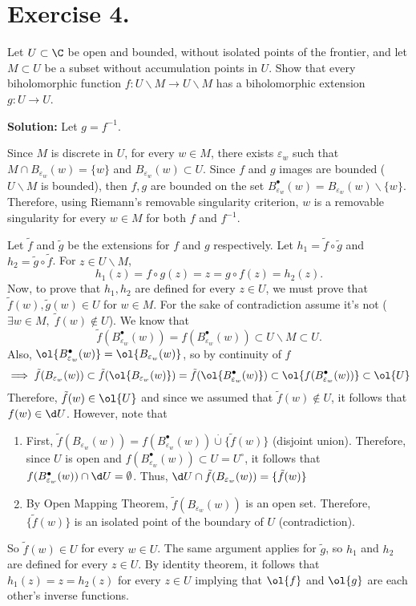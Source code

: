 \section*{Exercise 4.}

Let $U \subset \C$ be open and bounded, without isolated points of the frontier, and let $M \subset U$ be a subset without accumulation points in $U$. Show that every biholomorphic function $f: U \backslash M \to U \backslash M$ has a biholomorphic extension $g: U \to U$.

\textbf{Solution:}
Let $g = f^{-1}$.

Since $M$ is discrete in $U$, for every $w \in M$, there exists $\varepsilon_w$ such that $M \cap B_{\varepsilon_w}(w) = \{w\}$ and $B_{\varepsilon_w}(w) \subset U$. Since $f$ and $g$ images are bounded ($U\backslash M$ is bounded), then $f,g$ are bounded on the set $B_{\varepsilon_w}^\bullet(w) = B_{\varepsilon_w}(w) \backslash \{w\}$. Therefore, using Riemann's removable singularity criterion, $w$ is a removable singularity for every $w \in M$ for both $f$ and $f^{-1}$.

Let $\tilde{f}$ and $\tilde{g}$ be the extensions for $f$ and $g$ respectively. Let $h_1 = \tilde{f} \circ \tilde{g}$ and $h_2 = \tilde{g}\circ \tilde{f}$. For $z \in U\backslash M$, 
\[ h_1(z) = f\circ g (z) = z = g\circ f(z) = h_2(z). \]
Now, to prove that $h_1, h_2$ are defined for every $z\in U$, we must prove that $\tilde{f}(w), \tilde{g}(w) \in U$ for $w \in M$. For the sake of contradiction assume it's not ($\exists w \in M,\;\tilde{f}(w) \not\in U$). We know that
\[ \tilde{f}(B_{\varepsilon_w}^\bullet(w)) = f(B_{\varepsilon_w}^\bullet(w)) \subset U\backslash M \subset U.\]
Also, $\ol{B_{\varepsilon_w}^\bullet(w)} = \ol{B_{\varepsilon_w}(w)}$, so by continuity of $f$
\[ \implies \tilde{f}(B_{\varepsilon_w}(w)) \subset \tilde{f}(\ol{B_{\varepsilon_w}(w)}) = \tilde{f}(\ol{B_{\varepsilon_w}^\bullet(w)}) \subset \ol{f(B_{\varepsilon_w}^\bullet(w))} \subset \ol{U} \]
Therefore, $\tilde{f}(w) \in \ol{U}$ and since we assumed that $\tilde{f}(w) \not\in U$, it follows that $f(w) \in \d U$. However, note that
\begin{enumerate}
    \item First, $\tilde{f}(B_{\varepsilon_w}(w)) = f(B_{\varepsilon_w}^\bullet (w)) \overset{\cdot}{\cup} \{\tilde{f}(w)\}$ (disjoint union). Therefore, since $U$ is open and $ f(B_{\varepsilon_w}^\bullet (w)) \subset U = U^\circ$, it follows that $f(B_{\varepsilon_w}^\bullet (w)) \cap  \d U = \emptyset$. Thus, $ \d U \cap \tilde{f}(B_{\varepsilon_w}(w)) = \{\tilde{f}(w)\}$
    \item By Open Mapping Theorem, $\tilde{f}(B_{\varepsilon_w}(w))$ is an open set. Therefore, $\{\tilde{f}(w)\}$ is an isolated point of the boundary of $U$ (contradiction).
\end{enumerate}
So $\tilde{f}(w) \in U$ for every $w\in U$. The same argument applies for $\tilde{g}$, so $h_1$ and $h_2$ are defined for every $z\in U$. By identity theorem, it follows that $h_1(z) = z = h_2(z)$ for every $z\in U$ implying that $\ol{f}$ and $\ol{g}$ are each other's inverse functions.